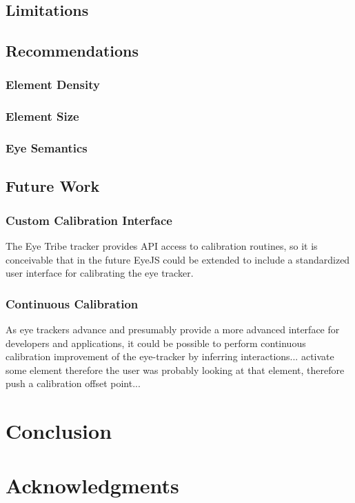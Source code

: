 \documentclass{sigchi}
\begin{document}
\subsection{Limitations}


\subsection{Recommendations}

\subsubsection{Element Density}

\subsubsection{Element Size}

\subsubsection{Eye Semantics}


\subsection{Future Work}

\subsubsection{Custom Calibration Interface}
The Eye Tribe tracker provides API access to calibration routines, so
it is conceivable that in the future EyeJS could be extended to include
a standardized user interface for calibrating the eye tracker.

\subsubsection{Continuous Calibration}
As eye trackers advance and presumably provide a more advanced interface
for developers and applications, it could be possible to perform
continuous calibration improvement of the eye-tracker by inferring
interactions... activate some element therefore the user was probably
looking at that element, therefore push a calibration offset point...



\section{Conclusion}



\section{Acknowledgments}



\balance{}



\end{document}

